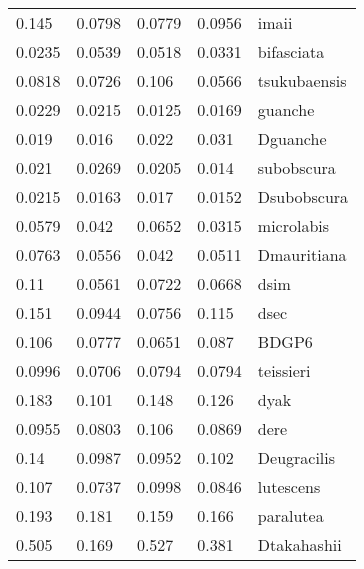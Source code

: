 \begin{tabular}{lllll}
          0.145 &          0.0798 &          0.0779 &        0.0956 &                   imaii \\
         0.0235 &          0.0539 &          0.0518 &        0.0331 &              bifasciata \\
         0.0818 &          0.0726 &           0.106 &        0.0566 &            tsukubaensis \\
         0.0229 &          0.0215 &          0.0125 &        0.0169 &                 guanche \\
          0.019 &           0.016 &           0.022 &         0.031 &                Dguanche \\
          0.021 &          0.0269 &          0.0205 &         0.014 &              subobscura \\
         0.0215 &          0.0163 &           0.017 &        0.0152 &             Dsubobscura \\
         0.0579 &           0.042 &          0.0652 &        0.0315 &              microlabis \\
         0.0763 &          0.0556 &           0.042 &        0.0511 &             Dmauritiana \\
           0.11 &          0.0561 &          0.0722 &        0.0668 &                    dsim \\
          0.151 &          0.0944 &          0.0756 &         0.115 &                    dsec \\
          0.106 &          0.0777 &          0.0651 &         0.087 &                   BDGP6 \\
         0.0996 &          0.0706 &          0.0794 &        0.0794 &               teissieri \\
          0.183 &           0.101 &           0.148 &         0.126 &                    dyak \\
         0.0955 &          0.0803 &           0.106 &        0.0869 &                    dere \\
           0.14 &          0.0987 &          0.0952 &         0.102 &             Deugracilis \\
          0.107 &          0.0737 &          0.0998 &        0.0846 &               lutescens \\
          0.193 &           0.181 &           0.159 &         0.166 &               paralutea \\
          0.505 &           0.169 &           0.527 &         0.381 &             Dtakahashii \\

\end{tabular}
